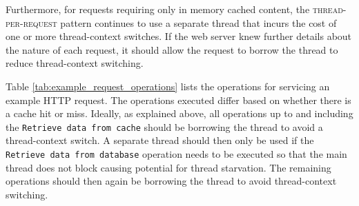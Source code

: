 \documentclass[prodmode]{style/acmlarge}
\begin{document}
Furthermore, for requests requiring only in memory cached content, the
\textsc{thread-per-request} pattern continues to use a separate thread that
incurs the cost of one or more thread-context switches.  If the web server knew
further details about the nature of each request, it should allow the request to
borrow the thread to reduce thread-context switching.

Table \ref{tab:example_request_operations} lists the operations for servicing an
example HTTP request.  The operations executed differ based on whether there is
a cache hit or miss.  Ideally, as explained above, all operations up to and
including the \texttt{Retrieve data from cache} should be borrowing the thread
to avoid a thread-context switch.  A separate thread should then only be used if
the \texttt{Retrieve data from database} operation needs to be executed so that
the main thread does not block causing potential for thread starvation.  The
remaining operations should then again be borrowing the thread to avoid
thread-context switching.

\begin{table}[t]
\label{tab:example_request_operations}
\end{table}
\end{document}

